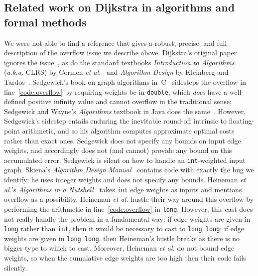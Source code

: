 \subsection{Related work on Dijkstra in algorithms and formal methods}
\label{sec:relworkdijkstra}
We were not able to find a reference that gives a robust, precise,
and full description of the overflow issue we describe above.
Dijkstra's original paper ignores the issue~\cite{DBLP:journals/nm/Dijkstra59}, as do the standard textbooks \emph{Introduction to Algorithms} (\emph{a.k.a.} CLRS) by Cormen \emph{et al.}~\cite{clrs} and \emph{Algorithm Design} by Kleinberg and Tardos~\cite{DBLP:books/daglib/0015106}.
Sedgewick's book on graph algorithms in~C~\cite{sedgewick} sidesteps the overflow in line~\ref{code:overflow} by requiring weights be in \texttt{double}, which \emph{does} have a well-defined positive infinity value and cannot overflow in the traditional sense; Sedgewick and Wayne's \emph{Algorithms} textbook in Java does the same~\cite{DBLP:books/daglib/0029345}.  However, Sedgewick's sidestep entails enduring the inevitable round-off intrinsic to floating-point arithmetic, and so his algorithm computes approximate optimal costs rather than exact ones.  Sedgewick does not specify any bounds on input edge weights, and accordingly does not (and cannot) provide any bound on this accumulated error.  Sedgewick is silent on how to handle an \texttt{int}-weighted input graph.  Skiena's \emph{Algorithm Design Manual}~\cite{DBLP:books/daglib/0022194} contains code with exactly the bug we identify: he uses integer weights and does not specify any bounds.  Heineman \emph{et al.}'s \emph{Algorithms in a Nutshell}~\cite{heineman2008algorithms} takes \texttt{int} edge weights as inputs and mentions overflow as a possibility.  Heineman \emph{et al.} hustle their way around this overflow by performing the arithmetic in line~\ref{code:overflow} in \texttt{long}.  However, this cast does not really handle the problem in a fundamental way: if edge weights are given in \texttt{long} rather than \texttt{int}, then it would be necessary to cast to \texttt{long long}; if edge weights are given in \texttt{long long}, then Heineman's hustle breaks as there is no bigger type to which to cast.  Moreover, Heineman \emph{et al.} do not bound edge weights, so when the cumulative edge weights are too high then their code fails silently. %

